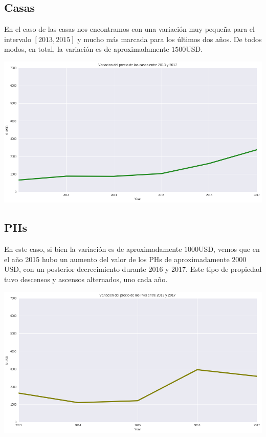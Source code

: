 \documentclass[a4paper, 10pt]{article}
\begin{document}
			\subsection{Casas}
				En el caso de las casas nos encontramos con una variación muy pequeña para el intervalo $[2013, 2015]$ y mucho
				más marcada para los últimos dos años. De todos modos, en total, la variación es de aproximadamente $1500$USD.
				\begin{center}
   		    			\includegraphics[width=\textwidth]{images/houseVariation}
				\end{center}
			\subsection{PHs}
				En este caso, si bien la variación es de aproximadamente $1000$USD, vemos que en el año 2015 hubo un aumento del
				valor de los PHs de aproximadamente $2000$USD, con un posterior decrecimiento durante 2016 y 2017. Este tipo
				de propiedad tuvo descensos y ascensos alternados, uno cada año.
				\begin{center}
   		    			\includegraphics[width=\textwidth]{images/phVariation}
				\end{center}
\end{document}
